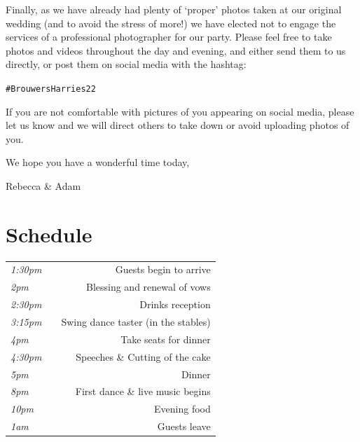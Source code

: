 \documentclass[a5paper,12pt,titlepage]{article}
\begin{document}
\hspace{2em}Finally, as we have already had plenty of `proper' photos taken at our original wedding (and to avoid the stress of more!) we have elected not to engage the services of a professional photographer for our party. Please feel free to take photos and videos throughout the day and evening, and either send them to us directly, or post them on social media with the hashtag:{\begin{center}\large \texttt{\#BrouwersHarries22} \end{center}} If you are not comfortable with pictures of you appearing on social media, please let us know and we will direct others to take down or avoid uploading photos of you.

\hspace{2em}We hope you have a wonderful time today,

\begin{flushright}
Rebecca \& Adam
\end{flushright}

\clearpage

\section{Schedule}
\begin{table}[h!]
\begin{center}
    \begin{tabular}{ l c r } 
{\em 1:30pm} & \hspace{5em} & Guests begin to arrive \\[5pt]
{\em 2pm} & \hspace{5em} & Blessing and renewal of vows \\[5pt]
{\em 2:30pm} & \hspace{5em} & Drinks reception \\[5pt]
{\em 3:15pm} & \hspace{5em} & Swing dance taster (in the stables) \\[5pt]
{\em 4pm} & \hspace{5em} & Take seats for dinner \\[5pt]
{\em 4:30pm} & \hspace{5em} & Speeches \& Cutting of the cake \\[5pt]
{\em 5pm} & \hspace{5em} & Dinner \\[5pt]
{\em 8pm} & \hspace{5em} & First dance \& live music begins \\[5pt]
{\em 10pm} & \hspace{5em} & Evening food \\[5pt]
{\em 1am} & \hspace{5em} & Guests leave \\
    \end{tabular}
\end{center}
\end{table}
\end{document}
